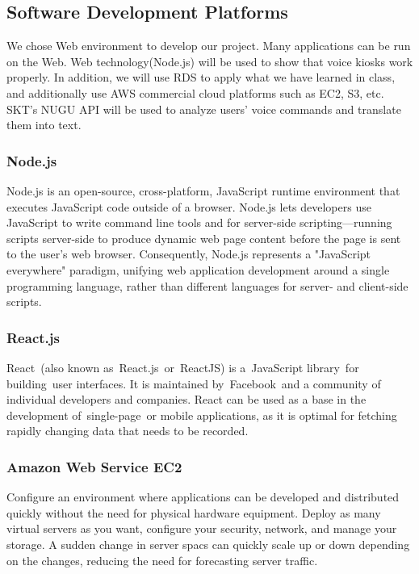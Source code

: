 \documentclass[conference,compsoc]{IEEEtran}
\begin{document}
\subsection{Software Development Platforms}

We chose Web environment to develop our project. Many applications can be run on the Web. Web technology(Node.js) will be used to show that voice kiosks work properly. In addition, we will use RDS to apply what we have learned in class, and additionally use AWS commercial cloud platforms such as EC2, S3, etc. SKT's NUGU API will be used to analyze users' voice commands and translate them into text.

\subsubsection{Node.js}

Node.js is an open-source, cross-platform, JavaScript runtime environment that executes JavaScript code outside of a browser. Node.js lets developers use JavaScript to write command line tools and for server-side scripting—running scripts server-side to produce dynamic web page content before the page is sent to the user's web browser. Consequently, Node.js represents a "JavaScript everywhere" paradigm, unifying web application development around a single programming language, rather than different languages for server- and client-side scripts.

\subsubsection{React.js}

React (also known as React.js or ReactJS) is a JavaScript library for building user interfaces. It is maintained by Facebook and a community of individual developers and companies. React can be used as a base in the development of single-page or mobile applications, as it is optimal for fetching rapidly changing data that needs to be recorded.

\subsubsection{Amazon Web Service EC2}

Configure an environment where applications can be developed and distributed quickly without the need for physical hardware equipment. Deploy as many virtual servers as you want, configure your security, network, and manage your storage. A sudden change in server spacs can quickly scale up or down depending on the changes, reducing the need for forecasting server traffic.
\end{document}
